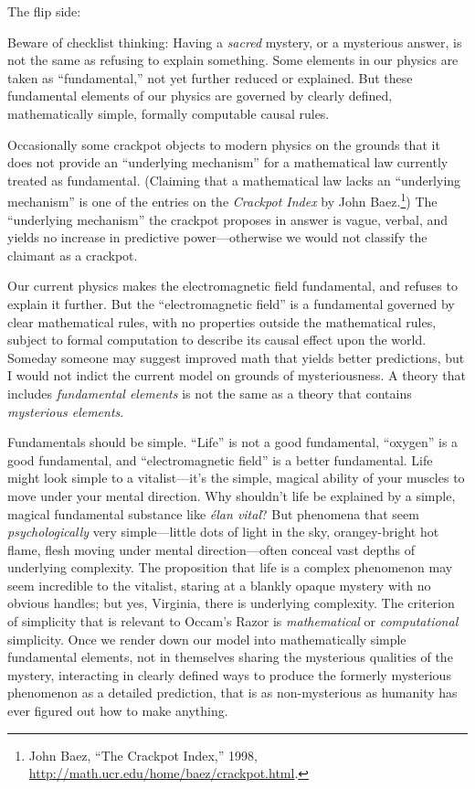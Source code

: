 {
 The flip side:}

{
 Beware of checklist thinking: Having a \textit{sacred} mystery, or
a mysterious answer, is not the same as refusing to explain something.
Some elements in our physics are taken as
``fundamental,'' not yet further
reduced or explained. But these fundamental elements of our physics are
governed by clearly defined, mathematically simple, formally computable
causal rules.}

{
 Occasionally some crackpot objects to modern physics on the
grounds that it does not provide an ``underlying
mechanism'' for a mathematical law currently treated
as fundamental. (Claiming that a mathematical law lacks an
``underlying mechanism'' is one of
the entries on the \textit{Crackpot Index} by John
Baez.\footnote{John Baez, ``The Crackpot
Index,'' 1998,
\url{http://math.ucr.edu/home/baez/crackpot.html}.}) The ``underlying
mechanism'' the crackpot proposes in answer is vague,
verbal, and yields no increase in predictive power---otherwise we would
not classify the claimant as a crackpot.}

{
 Our current physics makes the electromagnetic field fundamental,
and refuses to explain it further. But the
``electromagnetic field'' is a
fundamental governed by clear mathematical rules, with no properties
outside the mathematical rules, subject to formal computation to
describe its causal effect upon the world. Someday someone may suggest
improved math that yields better predictions, but I would not indict
the current model on grounds of mysteriousness. A theory that includes
\textit{fundamental elements} is not the same as a theory that contains
\textit{mysterious elements}.}

{
 Fundamentals should be simple.
``Life'' is not a good fundamental,
``oxygen'' is a good fundamental,
and ``electromagnetic field'' is a
better fundamental. Life might look simple to a
vitalist---it's the simple, magical ability of your
muscles to move under your mental direction. Why
shouldn't life be explained by a simple, magical
fundamental substance like \textit{élan vital}? But phenomena that seem
\textit{psychologically} very simple---little dots of light in the sky,
orangey-bright hot flame, flesh moving under mental direction---often
conceal vast depths of underlying complexity. The proposition that life
is a complex phenomenon may seem incredible to the vitalist, staring at
a blankly opaque mystery with no obvious handles; but yes, Virginia,
there is underlying complexity. The criterion of simplicity that is
relevant to Occam's Razor is \textit{mathematical} or
\textit{computational} simplicity. Once we render down our model into
mathematically simple fundamental elements, not in themselves sharing
the mysterious qualities of the mystery, interacting in clearly defined
ways to produce the formerly mysterious phenomenon as a detailed
prediction, that is as non-mysterious as humanity has ever figured out
how to make anything.}

